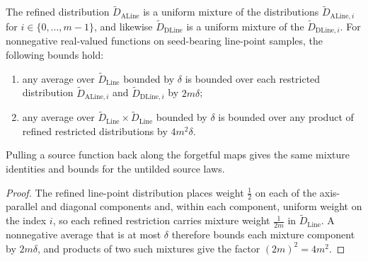 \begin{lemma}
	\label{lem:restricted-line-mixture-bounds}
	\leanok
	The refined distribution $\widetilde D_{\mathrm{ALine}}$ is a uniform
	mixture of the distributions $\widetilde D_{\mathrm{ALine},i}$ for
	$i \in \{0, \dots, m-1\}$, and likewise
	$\widetilde D_{\mathrm{DLine}}$ is a uniform mixture of the
	$\widetilde D_{\mathrm{DLine},i}$. For nonnegative real-valued functions
	on seed-bearing line-point samples, the following bounds hold:
	\begin{enumerate}
		\item any average over $\widetilde D_{\mathrm{Line}}$ bounded by
		$\delta$ is bounded over each restricted distribution
		$\widetilde D_{\mathrm{ALine},i}$ and
		$\widetilde D_{\mathrm{DLine},i}$ by $2m\delta$;
		\item any average over
		$\widetilde D_{\mathrm{Line}}\times\widetilde D_{\mathrm{Line}}$
		bounded by $\delta$ is bounded over any product of refined restricted
		distributions by $4m^2\delta$.
	\end{enumerate}
	Pulling a source function back along the forgetful maps gives the same
	mixture identities and bounds for the untilded source laws.
\end{lemma}
\begin{proof}
	\leanok
	The refined line-point distribution places weight $\tfrac{1}{2}$ on each of
	the axis-parallel and diagonal components and, within each component,
	uniform weight on the index $i$, so each refined restriction carries mixture
	weight $\tfrac{1}{2m}$ in $\widetilde D_{\mathrm{Line}}$. A nonnegative
	average that is at most $\delta$ therefore bounds each mixture component by
	$2m\delta$, and products of two such mixtures give the factor
	$(2m)^2 = 4m^2$.
\end{proof}

